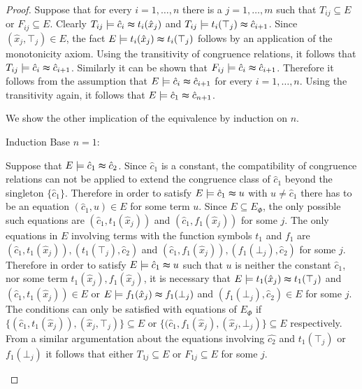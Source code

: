 \begin{proof}

Suppose that for every $i = 1,\ldots,n$ there is a $j = 1,\ldots,m$ such that $T_{ij} \subseteq E$ or $F_{ij} \subseteq E$.
Clearly $T_{ij} \models \hat{c}_i \thickapprox t_i(\hat{x}_j)$ and $T_{ij} \models t_i(\top_j) \thickapprox \hat{c}_{i+1}$. 
Since $(\hat{x}_j,\top_j) \in E$, the fact $E \models t_i(\hat{x}_j) \thickapprox t_i(\top_j)$ follows by an application of the monotonicity axiom.
Using the transitivity of congruence relations, it follows that $T_{ij} \models \hat{c}_i \thickapprox \hat{c}_{i+1}$.
Similarly it can be shown that $F_{ij} \models \hat{c}_i \thickapprox \hat{c}_{i+1}$.
Therefore it follows from the assumption that $E \models \hat{c}_i \thickapprox \hat{c}_{i+1}$ for every $i = 1,\ldots,n$.
Using the transitivity again, it follows that $E \models \hat{c}_1 \thickapprox \hat{c}_{n+1}$.

\noindent We show the other implication of the equivalence by induction on $n$.
\begin{paragraph}{Induction Base $n = 1$:}

Suppose that $E \models \hat{c}_1 \thickapprox \hat{c}_{2}$. %
Since $\hat{c}_1$ is a constant, the compatibility of congruence relations can not be applied to extend the congruence class of $\hat{c}_1$ beyond the singleton $\{\hat{c}_1\}$.
Therefore in order to satisfy $E \models \hat{c}_1 \thickapprox u$ with $u \neq \hat{c}_1$ there has to be an equation $(\hat{c}_1, u) \in E$ for some term $u$.
Since $E \subseteq E_{\Phi}$, the only possible such equations are $(\hat{c}_1, t_1(\hat{x}_j))$ and $(\hat{c}_1, f_1(\hat{x}_j))$ for some $j$.
The only equations in $E$ involving terms with the function symbols $t_1$ and $f_1$ are $(\hat{c}_1, t_1(\hat{x}_j)), (t_1(\top_j),\hat{c}_2)$ and $(\hat{c}_1, f_1(\hat{x}_j)), (f_1(\bot_j),\hat{c}_2)$ for some $j$.
Therefore in order to satisfy $E \models \hat{c}_1 \thickapprox u$ such that $u$ is neither the constant $\hat{c}_1$, nor some term $t_1(\hat{x}_j), f_1(\hat{x}_j)$, it is necessary that $E \models t_1(\hat{x}_j) \thickapprox t_1(\top_j)$ and $(\hat{c}_1, t_1(\hat{x}_j)) \in E$ or $E \models f_1(\hat{x}_j) \thickapprox f_1(\bot_j)$ and $(f_1(\bot_j),\hat{c}_2) \in E$ for some $j$.
The conditions can only be satisfied with equations of $E_{\Phi}$ if $\{(\hat{c}_1, t_1(\hat{x}_j)), (\hat{x}_j,\top_j)\} \subseteq E$ or $\{(\hat{c}_1, f_1(\hat{x}_j), (\hat{x}_j,\bot_j)\} \subseteq E$ respectively.
From a similar argumentation about the equations involving $\hat{c_2}$ and $t_1(\top_j)$ or $f_1(\bot_j)$ it follows that either $T_{1j} \subseteq E$ or $F_{1j} \subseteq E$ for some $j$.
\end{paragraph}


\end{proof}
